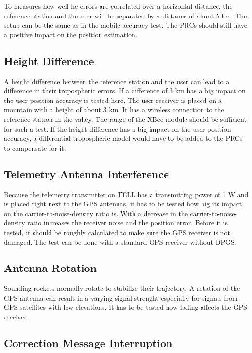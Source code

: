 To measures how well he errors are correlated over a horizontal distance, the reference station and the user will be separated by a distance of about 5 km.
The setup can be the same as in the mobile accuracy test.
The PRCs should still have a positive impact on the position estimation.

\subsection{Height Difference}

A height difference between the reference station and the user can lead to a difference in their tropospheric errors.
If a difference of 3 km has a big impact on the user position accuracy is tested here.
The user receiver is placed on a mountain with a height of about 3 km.
It has a wireless connection to the reference station in the valley.
The range of the XBee module should be sufficient for such a test.
If the height difference has a big impact on the user position accuracy, a differential tropospheric model would have to be added to the PRCs to compensate for it.

\subsection{Telemetry Antenna Interference}

Because the telemetry transmitter on TELL has a transmitting power of 1 W and is placed right next to the GPS antennas, it has to be tested how big its impact on the carrier-to-noise-density ratio is.
With a decrease in the carrier-to-noise-density ratio increases the receiver noise and the position error.
Before it is tested, it should be roughly calculated to make sure the GPS receiver is not damaged.
The test can be done with a standard GPS receiver without DPGS.

\subsection{Antenna Rotation}

Sounding rockets normally rotate to stabilize their trajectory.
A rotation of the GPS antenna can result in a varying signal strenght especially for signals from GPS satellites with low elevations.
It has to be tested how fading affects the GPS receiver.

\subsection{Correction Message Interruption}

